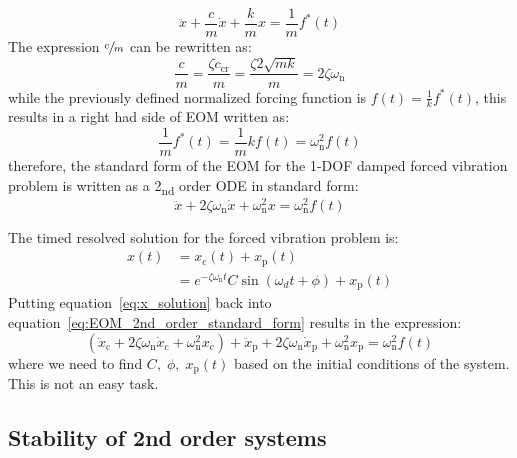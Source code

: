 \documentclass[12pt,letter]{article}
\begin{document}
\begin{equation}
\ddot{x} + \frac{c}{m}\dot{x} + \frac{k}{m}x = \frac{1}{m}f^*(t)
\end{equation}
The expression $\sfrac{c}{m}$ can be rewritten as:
\begin{equation}
\frac{c}{m} = \frac{\zeta c_\text{cr}}{m} = \frac{\zeta 2 \sqrt{m k}}{m} = 2 \zeta \omega_\text{n}
\end{equation}
while the previously defined normalized forcing function is $f(t) = \frac{1}{k}f^*(t)$, this results in a right had side of EOM written as:
\begin{equation}
\frac{1}{m}f^*(t) = \frac{1}{m}kf(t) = \omega^2_\text{n}f(t)
\end{equation}
therefore, the standard form of the EOM for the 1-DOF damped forced vibration problem is written as a 2\textsubscript{nd} order ODE in standard form:
\begin{equation}
\ddot{x} + 2 \zeta \omega_\text{n} \dot{x} + \omega_\text{n}^2 x = \omega_\text{n}^2f(t)
\label{eq:EOM_2nd_order_standard_form}
\end{equation}

The timed resolved solution for the forced vibration problem is:
\begin{align}
\label{eq:x_solution}
x(t) &= x_\text{c}(t) + x_\text{p}(t)  \\
& = e^{-\zeta \omega_\text{n} t } C \sin (\omega_d t + \phi) + x_\text{p}(t) \nonumber
\end{align}
 Putting equation~\ref{eq:x_solution} back into equation~\ref{eq:EOM_2nd_order_standard_form} results in the expression:
\begin{equation}
(\ddot{x}_\text{c} + 2 \zeta \omega_\text{n} \dot{x}_\text{c} + \omega_\text{n}^2 x_\text{c}) + \ddot{x}_\text{p} + 2 \zeta \omega_\text{n} \dot{x}_\text{p} + \omega_\text{n}^2 x_\text{p} = \omega_\text{n}^2f(t)
\end{equation}
where we need to find $C, \; \phi, \; x_\text{p}(t)$ based on the initial conditions of the system. This is not an easy task. 



%


\subsection{Stability of 2nd order systems}
\end{document}
